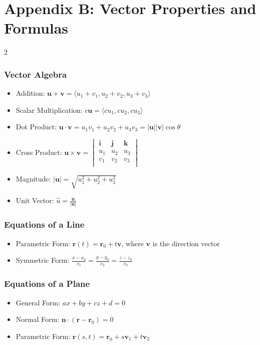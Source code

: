 \chapter*{Appendix B: Vector Properties and Formulas}
\begin{multicols}{2}
\subsection*{Vector Algebra}
\begin{itemize}
\item Addition: $\mathbf{u} + \mathbf{v} = \langle u_1+v_1, u_2+v_2, u_3+v_3 \rangle$
\item Scalar Multiplication: $c\mathbf{u} = \langle cu_1, cu_2, cu_3 \rangle$
\item Dot Product: $\mathbf{u} \cdot \mathbf{v} = u_1v_1 + u_2v_2 + u_3v_3 = |\mathbf{u}||\mathbf{v}|\cos\theta$
\item Cross Product: $\mathbf{u} \times \mathbf{v} = \begin{vmatrix}
\mathbf{i} & \mathbf{j} & \mathbf{k} \\
u_1 & u_2 & u_3 \\
v_1 & v_2 & v_3 \\
\end{vmatrix}$
\item Magnitude: $|\mathbf{u}| = \sqrt{u_1^2 + u_2^2 + u_3^2}$
\item Unit Vector: $\hat{u} = \frac{\mathbf{u}}{|\mathbf{u}|}$
\end{itemize}

\subsection*{Equations of a Line}
\begin{itemize}
\item Parametric Form: $\mathbf{r}(t) = \mathbf{r}_0 + t\mathbf{v}$, where $\mathbf{v}$ is the direction vector
\item Symmetric Form: $\frac{x-x_0}{v_1} = \frac{y-y_0}{v_2} = \frac{z-z_0}{v_3}$
\end{itemize}

\subsection*{Equations of a Plane}
\begin{itemize}
\item General Form: $ax + by + cz + d = 0$
\item Normal Form: $\mathbf{n} \cdot (\mathbf{r} - \mathbf{r}_0) = 0$
\item Parametric Form: $\mathbf{r}(s,t) = \mathbf{r}_0 + s\mathbf{v}_1 + t\mathbf{v}_2$
\end{itemize}


\end{multicols}
